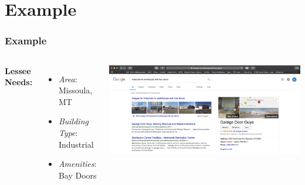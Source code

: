 \documentclass{beamer}
\begin{document}

\section{Example}


\begin{frame}
\frametitle{Example}
\begin{columns}[c]
\textbf{Lessee Needs: } 
\begin{itemize}
\item\textit{Area}: Missoula, MT
\item\textit{Building Type}: Industrial
\item\textit{Amenities}: Bay Doors
\end{itemize}
\includegraphics[width=1\textwidth]{Screenshot.png}
\end{columns}
\end{frame}
\end{document}
